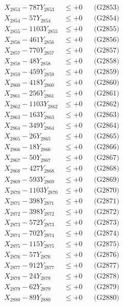 \documentclass[a4paper,10pt]{article}
\begin{document}
{\begin{align}
X_{2853} - 787Y_{2853} &\leq +0 && \text{(G2853)} \\
X_{2854} - 57Y_{2854} &\leq +0 && \text{(G2854)} \\
X_{2855} - 1103Y_{2855} &\leq +0 && \text{(G2855)} \\
X_{2856} - 461Y_{2856} &\leq +0 && \text{(G2856)} \\
X_{2857} - 770Y_{2857} &\leq +0 && \text{(G2857)} \\
X_{2858} - 48Y_{2858} &\leq +0 && \text{(G2858)} \\
X_{2859} - 459Y_{2859} &\leq +0 && \text{(G2859)} \\
X_{2860} - 418Y_{2860} &\leq +0 && \text{(G2860)} \\
\allowbreak
X_{2861} - 256Y_{2861} &\leq +0 && \text{(G2861)} \\
X_{2862} - 1103Y_{2862} &\leq +0 && \text{(G2862)} \\
X_{2863} - 163Y_{2863} &\leq +0 && \text{(G2863)} \\
X_{2864} - 349Y_{2864} &\leq +0 && \text{(G2864)} \\
X_{2865} - 26Y_{2865} &\leq +0 && \text{(G2865)} \\
X_{2866} - 18Y_{2866} &\leq +0 && \text{(G2866)} \\
X_{2867} - 50Y_{2867} &\leq +0 && \text{(G2867)} \\
X_{2868} - 427Y_{2868} &\leq +0 && \text{(G2868)} \\
X_{2869} - 593Y_{2869} &\leq +0 && \text{(G2869)} \\
X_{2870} - 1103Y_{2870} &\leq +0 && \text{(G2870)} \\
\allowbreak
X_{2871} - 398Y_{2871} &\leq +0 && \text{(G2871)} \\
X_{2872} - 398Y_{2872} &\leq +0 && \text{(G2872)} \\
X_{2873} - 572Y_{2873} &\leq +0 && \text{(G2873)} \\
X_{2874} - 702Y_{2874} &\leq +0 && \text{(G2874)} \\
X_{2875} - 115Y_{2875} &\leq +0 && \text{(G2875)} \\
X_{2876} - 57Y_{2876} &\leq +0 && \text{(G2876)} \\
X_{2877} - 912Y_{2877} &\leq +0 && \text{(G2877)} \\
X_{2878} - 24Y_{2878} &\leq +0 && \text{(G2878)} \\
X_{2879} - 62Y_{2879} &\leq +0 && \text{(G2879)} \\
X_{2880} - 89Y_{2880} &\leq +0 && \text{(G2880)} \\

\end{align}}
\end{document}

